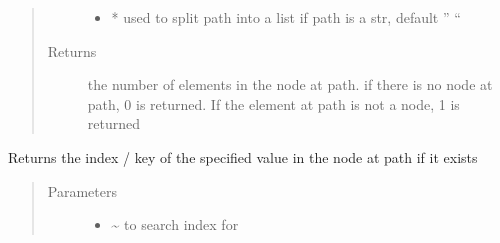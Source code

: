 \documentclass[a4paper,10pt,english]{sphinxmanual}
\begin{document}
\begin{fulllineitems}
\begin{fulllineitems}
\begin{quote}
\begin{description}
\begin{itemize}
\item {}
\sphinxAtStartPar
{} \textendash{} * used to split path into a list if path is a str, default ” “

\end{itemize}

\item[{Returns}] \leavevmode
\sphinxAtStartPar
the number of elements in the node at path. if there is no node at path, 0 is returned. If the element
at path is not a node, 1 is returned

\end{description}\end{quote}

\end{fulllineitems}


\begin{fulllineitems}
\label{\detokenize{fagus:fagus.Fagus.index}}
\pysigstartsignatures
{}
\pysigstopsignatures
\sphinxAtStartPar
Returns the index / key of the specified value in the node at path if it exists
\begin{quote}\begin{description}
\item[{Parameters}] \leavevmode\begin{itemize}
\item {}
\sphinxAtStartPar
{} \textendash{} \textasciitilde{} to search index for


\end{itemize}
\end{description}
\end{quote}
\end{fulllineitems}
\end{fulllineitems}
\end{document}
